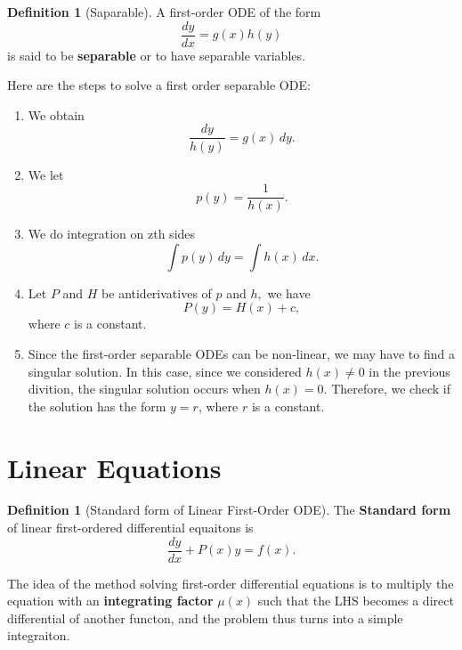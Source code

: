 \documentclass[12pt,a4paper]{report}
\theoremstyle{definition}
\newtheorem{definition}[theorem]{Definition}
\theoremstyle{remark}
\begin{document}
\begin{definition}[Saparable]
    A first-order ODE of the form 
    \[\frac{dy}{dx} = g(x)h(y)\]
    is said to be \textbf{separable} or to have separable variables.
\end{definition}

Here are the steps to solve a first order separable ODE:

\begin{enumerate}
    \item We obtain 
    \[\frac{dy}{h(y)} = g(x) \, dy.\]
    \item We let
    \[p(y) = \displaystyle\frac{1}{h(x)}.\]
    \item We do integration on zth sides
    \[\int p(y) \, dy = \int h(x) \, dx.\]
    \item Let $P$ and $H$ be antiderivatives of $p$ and $h,$ we have 
    \[P(y) = H(x) + c,\]
    where $c$ is a constant.
    \item Since the first-order separable ODEs can be non-linear, we may have to find a singular solution. In this case, since we considered $h(x) \neq 0$ in the previous divition, the singular solution occurs when $h(x) = 0.$ Therefore, we check if the solution has the form $y = r$, where $r$ is a constant.
\end{enumerate}

\section{Linear Equations}

\begin{definition}[Standard form of Linear First-Order ODE]
    The \textbf{Standard form} of linear first-ordered differential equaitons is
    \[\frac{dy}{dx} + P(x)y = f(x).\]
\end{definition}

The idea of the method solving first-order differential equations is to multiply the equation with an \textbf{integrating factor} $\mu(x)$ such that the LHS becomes a direct differential of another functon, and the problem thus turns into a simple integraiton.  
\end{document}
